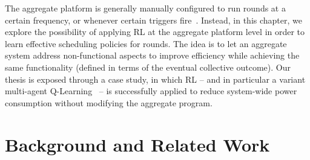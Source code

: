 The aggregate platform is generally manually configured to run rounds at a certain frequency, or whenever certain triggers fire~\cite{danilo2021lmcs}.
%
Instead, in this chapter, 
 we explore the possibility of applying \ac{RL} at the aggregate platform level
 in order to learn effective scheduling policies for rounds.
%
The idea is to let an aggregate system
 address non-functional aspects  
 to improve efficiency %
 while 
 achieving the same functionality
 (defined in terms of the eventual collective outcome). 
%
Our thesis is exposed through a case study, in which \ac{RL} -- and in particular a variant multi-agent Q-Learning~\cite{DBLP:conf/icml/LauerR00} -- is successfully applied to reduce system-wide power consumption without modifying the aggregate program.   

\section{Background and Related Work}


